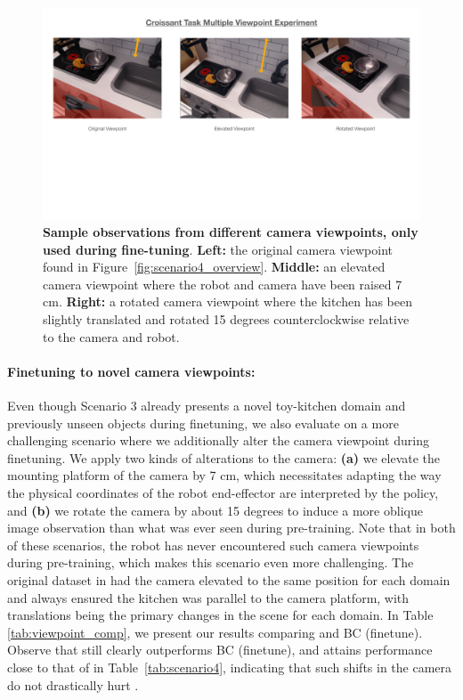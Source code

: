 \documentclass[../thesis.tex]{subfiles}
\begin{document}
\begin{figure}[h]
\vspace{-0.3cm}
\centering
  \includegraphics[width=0.9\linewidth]{chapters/ptr/MultViewpoint.pdf}
  \vspace{-0.3cm}
  \caption{\footnotesize \textbf{Sample observations from different camera viewpoints, only used during fine-tuning}. \textbf{Left:} the original camera viewpoint found in Figure~\ref{fig:scenario4_overview}. \textbf{Middle:} an elevated camera viewpoint where the robot and camera have been raised 7 cm. \textbf{Right:} a rotated camera viewpoint where the kitchen has been slightly translated and rotated 15 degrees counterclockwise relative to the camera and robot.}
  \label{fig:multviewpoint}
  \vspace{-0.2cm}
\end{figure}

\paragraph{Finetuning to novel camera viewpoints:} Even though Scenario 3 already presents a novel toy-kitchen domain and previously unseen objects during finetuning, we also evaluate \ptrmethodname on a more challenging scenario where we additionally alter the camera viewpoint during finetuning. We apply two kinds of alterations to the camera: \textbf{(a)} we elevate the mounting platform of the camera by 7 cm, which necessitates adapting the way the physical coordinates of the robot end-effector are interpreted by the policy, and \textbf{(b)} we rotate the camera by about 15 degrees to induce a more oblique image observation than what was ever seen during pre-training. Note that in both of these scenarios, the robot has never encountered such camera viewpoints during pre-training, which makes this scenario even more challenging. The original dataset in \citep{ebert2021bridge} had the camera elevated to the same position for each domain and always ensured the kitchen was parallel to the camera platform, with translations being the primary changes in the scene for each domain. In Table \ref{tab:viewpoint_comp}, we present our results comparing \ptrmethodname and BC (finetune). Observe that \ptrmethodname still clearly outperforms BC (finetune), and attains performance close to that of \ptrmethodname in Table~\ref{tab:scenario4}, indicating that such shifts in the camera do not drastically hurt \ptrmethodname.
\end{document}
